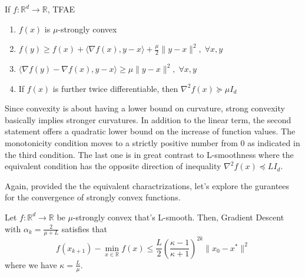 \begin{lemma}
    If $f: \mathbb{R}^d \rightarrow \mathbb{R}$, TFAE
    \begin{enumerate}
        \item $f(x)$ is $\mu$-strongly convex
        \item $f(y) \geq f(x) + \langle \nabla f(x), y-x \rangle + \frac{\mu}{2}\|y-x\|^2, \; \forall x,y$
        \item $\langle \nabla f(y) - \nabla f(x), y-x \rangle \geq \mu \|y-x\|^2, \; \forall x,y$
        \item If $f(x)$ is further twice differentiable, then $\nabla^2f(x) \succeq \mu I_d$
    \end{enumerate}
\end{lemma}
\begin{remark}
    Since convexity is about having a lower bound on curvature, strong convexity basically implies stronger curvatures. In addition to the linear term, the second statement offers a quadratic lower bound on the increase of function values. The monotonicity condition moves to a strictly positive number from 0 as indicated in the third condition. The last one is in great contrast to L-smoothness where the equivalent condition has the opposite direction of inequality $\nabla^2 f(x) \preceq LI_d$.
\end{remark}

Again, provided the the equivalent charactrizations, let's explore the gurantees for the convergence of strongly convex functions.

\begin{theorem}
    Let $f: \mathbb{R}^d \rightarrow \mathbb{R}$ be $\mu$-strongly convex that's L-smooth. Then, Gradient Descent with $\alpha_k = \frac{2}{\mu + L}$ satisfies that 
    \begin{equation*}
        f(x_{k+1}) - \min_{x \in \mathbb{R}} f(x) \leq \frac{L}{2}(\frac{\kappa - 1}{\kappa + 1})^{2k} \|x_0 - x^*\|^2
    \end{equation*}
    where we have $\kappa = \frac{L}{\mu}$.
\end{theorem}